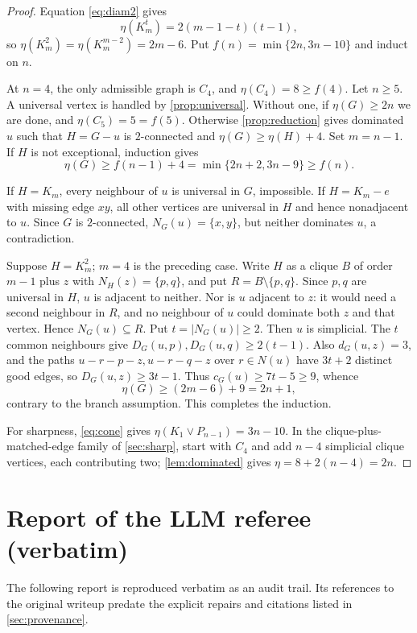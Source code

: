 \documentclass[11pt,a4paper]{article}
\theoremstyle{plain}
\theoremstyle{definition}
\theoremstyle{remark}
\begin{document}
\label{pf:main}
\thmmain*
\begin{proof}
Equation \eqref{eq:diam2} gives
\begin{equation}\label{eq:kt}
 \eta(K_m^t)=2(m-1-t)(t-1),
\end{equation}
so $\eta(K_m^2)=\eta(K_m^{m-2})=2m-6$. Put
$f(n)=\min\{2n,3n-10\}$ and induct on $n$.

At $n=4$, the only admissible graph is $C_4$, and
$\eta(C_4)=8\ge f(4)$. Let $n\ge5$. A universal vertex is handled by
\cref{prop:universal}. Without one, if $\eta(G)\ge2n$ we are done, and
$\eta(C_5)=5=f(5)$. Otherwise \cref{prop:reduction} gives dominated $u$
such that $H=G-u$ is $2$-connected and $\eta(G)\ge\eta(H)+4$. Set
$m=n-1$. If $H$ is not exceptional, induction gives
\[
 \eta(G)\ge f(n-1)+4=\min\{2n+2,3n-9\}\ge f(n).
\]

If $H=K_m$, every neighbour of $u$ is universal in $G$, impossible. If
$H=K_m-e$ with missing edge $xy$, all other vertices are universal in
$H$ and hence nonadjacent to $u$. Since $G$ is $2$-connected,
$N_G(u)=\{x,y\}$, but neither dominates $u$, a contradiction.

Suppose $H=K_m^2$; $m=4$ is the preceding case. Write $H$ as a clique
$B$ of order $m-1$ plus $z$ with $N_H(z)=\{p,q\}$, and put
$R=B\setminus\{p,q\}$. Since $p,q$ are universal in $H$, $u$ is adjacent
to neither. Nor is $u$ adjacent to $z$: it would need a second neighbour
in $R$, and no neighbour of $u$ could dominate both $z$ and that vertex.
Hence $N_G(u)\subseteq R$. Put $t=|N_G(u)|\ge2$. Then $u$ is simplicial.
The $t$ common neighbours give
$D_G(u,p),D_G(u,q)\ge2(t-1)$. Also $d_G(u,z)=3$, and the paths
$u-r-p-z,u-r-q-z$ over $r\in N(u)$ have $3t+2$ distinct good edges, so
$D_G(u,z)\ge3t-1$. Thus $c_G(u)\ge7t-5\ge9$, whence
\[
 \eta(G)\ge(2m-6)+9=2n+1,
\]
contrary to the branch assumption. This completes the induction.

For sharpness, \eqref{eq:cone} gives
$\eta(K_1\vee P_{n-1})=3n-10$. In the clique-plus-matched-edge family of
\cref{sec:sharp}, start with $C_4$ and add $n-4$ simplicial clique
vertices, each contributing two; \cref{lem:dominated} gives
$\eta=8+2(n-4)=2n$.
\end{proof}

\section{Report of the LLM referee (verbatim)}\label{app:referee}
\begin{tcolorbox}[colback=black!4,colframe=black!35,title={Status of this appendix}]
The following report is reproduced verbatim as an audit trail. Its
references to the original writeup predate the explicit repairs and
citations listed in \cref{sec:provenance}.
\end{tcolorbox}

\end{document}
